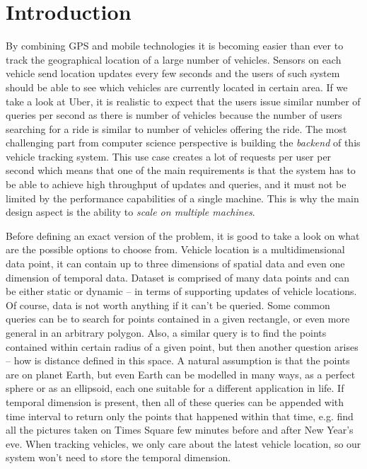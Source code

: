 \documentclass[times, utf8, diplomski]{fer}
\begin{document}
\chapter{Introduction}
By combining GPS and mobile technologies it is becoming easier than ever to track the geographical location of a large number of vehicles. Sensors on each vehicle send location updates every few seconds and the users of such system should be able to see which vehicles are currently located in certain area. If we take a look at Uber, it is realistic to expect that the users issue similar number of queries per second as there is number of vehicles because the number of users searching for a ride is similar to number of vehicles offering the ride. The most challenging part from computer science perspective is building the \emph{backend} of this vehicle tracking system. This use case creates a lot of requests per user per second which means that one of the main requirements is that the system has to be able to achieve high throughput of updates and queries, and it must not be limited by the performance capabilities of a single machine. This is why the main design aspect is the ability to \emph{scale on multiple machines}.

Before defining an exact version of the problem, it is good to take a look on what are the possible options to choose from. Vehicle location is a multidimensional data point, it can contain up to three dimensions of spatial data and even one dimension of temporal data. Dataset is comprised of many data points and can be either static or dynamic -- in terms of supporting updates of vehicle locations. Of course, data is not worth anything if it can't be queried. Some common queries can be to search for points contained in a given rectangle, or even more general in an arbitrary polygon. Also, a similar query is to find the points contained within certain radius of a given point, but then another question arises -- how is distance defined in this space. A natural assumption is that the points are on planet Earth, but even Earth can be modelled in many ways, as a perfect sphere or as an ellipsoid, each one suitable for a different application in life. If temporal dimension is present, then all of these queries can be appended with time interval to return only the points that happened within that time, e.g. find all the pictures taken on Times Square few minutes before and after New Year's eve. When tracking vehicles, we only care about the latest vehicle location, so our system won't need to store the temporal dimension.
\end{document}

